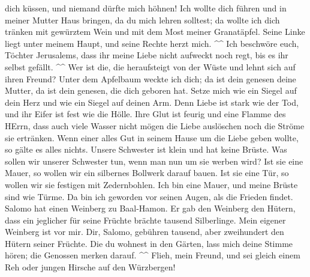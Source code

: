 dich küssen, und niemand dürfte mich höhnen!  Ich wollte
dich führen und in meiner Mutter Haus bringen, da du mich lehren
solltest; da wollte ich dich tränken mit gewürztem Wein und mit dem Most
meiner Granatäpfel.  Seine Linke liegt unter meinem Haupt,
und seine Rechte herzt mich. \^{}\^{}  Ich beschwöre euch,
Töchter Jerusalems, dass ihr meine Liebe nicht aufweckt noch regt, bis
es ihr selbst gefällt. \^{}\^{}  Wer ist die, die
heraufsteigt von der Wüste und lehnt sich auf ihren Freund? Unter dem
Apfelbaum weckte ich dich; da ist dein genesen deine Mutter, da ist dein
genesen, die dich geboren hat.  Setze mich wie ein Siegel
auf dein Herz und wie ein Siegel auf deinen Arm. Denn Liebe ist stark
wie der Tod, und ihr Eifer ist fest wie die Hölle. Ihre Glut ist feurig
und eine Flamme des HErrn,  dass auch viele Wasser nicht
mögen die Liebe auslöschen noch die Ströme sie ertränken. Wenn einer
alles Gut in seinem Hause um die Liebe geben wollte, so gälte es alles
nichts.  Unsere Schwester ist klein und hat keine Brüste.
Was sollen wir unserer Schwester tun, wenn man nun um sie werben wird?
 Ist sie eine Mauer, so wollen wir ein silbernes Bollwerk
darauf bauen. Ist sie eine Tür, so wollen wir sie festigen mit
Zedernbohlen.  Ich bin eine Mauer, und meine Brüste sind
wie Türme. Da bin ich geworden vor seinen Augen, als die Frieden findet.
 Salomo hat einen Weinberg zu Baal-Hamon. Er gab den
Weinberg den Hütern, dass ein jeglicher für seine Früchte brächte
tausend Silberlinge.  Mein eigener Weinberg ist vor mir.
Dir, Salomo, gebühren tausend, aber zweihundert den Hütern seiner
Früchte.  Die du wohnest in den Gärten, lass mich deine
Stimme hören; die Genossen merken darauf. \^{}\^{}  Flieh,
mein Freund, und sei gleich einem Reh oder jungen Hirsche auf den
Würzbergen!
